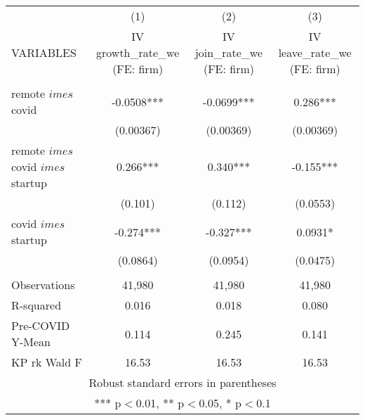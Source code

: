\documentclass[]{article}
\begin{document}
\begin{tabular}{lccc} \hline
 & (1) & (2) & (3) \\
VARIABLES & IV growth\_rate\_we (FE: firm) & IV join\_rate\_we (FE: firm) & IV leave\_rate\_we (FE: firm) \\ \hline
 &  &  &  \\
remote $	imes$ covid & -0.0508*** & -0.0699*** & 0.286*** \\
 & (0.00367) & (0.00369) & (0.00369) \\
remote $	imes$ covid $	imes$ startup & 0.266*** & 0.340*** & -0.155*** \\
 & (0.101) & (0.112) & (0.0553) \\
covid $	imes$ startup & -0.274*** & -0.327*** & 0.0931* \\
 & (0.0864) & (0.0954) & (0.0475) \\
 &  &  &  \\
Observations & 41,980 & 41,980 & 41,980 \\
R-squared & 0.016 & 0.018 & 0.080 \\
Pre-COVID Y-Mean & 0.114 & 0.245 & 0.141 \\
 KP rk Wald F & 16.53 & 16.53 & 16.53 \\ \hline
\multicolumn{4}{c}{ Robust standard errors in parentheses} \\
\multicolumn{4}{c}{ *** p$<$0.01, ** p$<$0.05, * p$<$0.1} \\
\end{tabular}
\end{document}
